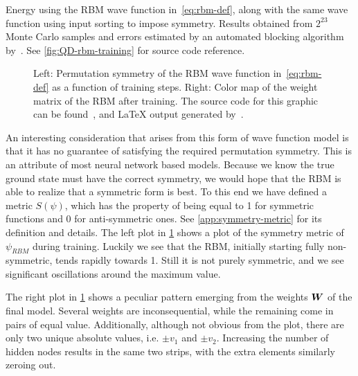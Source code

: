 \documentclass[Thesis.tex]{subfiles}
\begin{document}
\begin{table}[h]
  \centering
  
  \caption{Energy using the RBM wave function in~\cref{eq:rbm-def}, along with
the same wave function using input sorting to impose symmetry. Results obtained
from $2^{23}$ Monte Carlo samples and errors estimated by an automated blocking
algorithm by~\textcite{Jonsson-2018}. See
\cref{fig:QD-rbm-training} for source code reference.}
  \label{tab:rbm-energy-results}
\end{table}

\begin{figure}[h]
   \centering
    \resizebox{\linewidth}{!}{%
        
    }
    \caption{\label{fig:QD-rbm-symmetry}Left: Permutation symmetry of the RBM wave
function in~\cref{eq:rbm-def} as a function of training steps. Right: Color map
of the weight matrix of the RBM after training. The source code for this graphic
can be found~\cite[TODO: Add path]{MS-thesis-repository}, and \LaTeX{} output
generated by~\cite{nico_schlomer_2018_1173090}.}
\end{figure}

An interesting consideration that arises from this form of wave function model
is that it has no guarantee of satisfying the required permutation symmetry.
This is an attribute of most neural network based models. Because we know the
true ground state must have the correct symmetry, we would hope that the RBM is
able to realize that a symmetric form is best. To this end we have defined a
metric $S(\psi)$, which has the property of being equal to 1 for symmetric
functions and $0$ for anti-symmetric ones. See \cref{app:symmetry-metric} for
its definition and details. The left plot in \cref{fig:QD-rbm-symmetry} shows a
plot of the symmetry metric of $\psi_{RBM}$ during training. Luckily we see
that the RBM, initially starting fully non-symmetric, tends rapidly towards 
1. Still it is not purely symmetric, and we see significant
oscillations around the maximum value.

The right plot in \cref{fig:QD-rbm-symmetry} shows a peculiar pattern emerging
from the weights $\bm{W}$ of the final model. Several weights are
inconsequential, while the remaining come in pairs of equal value. Additionally,
although not obvious from the plot, there are only two unique absolute values,
i.e. $\pm v_1$ and $\pm v_2$. Increasing the number of hidden nodes results in
the same two strips, with the extra elements similarly zeroing out. 
\end{document}

